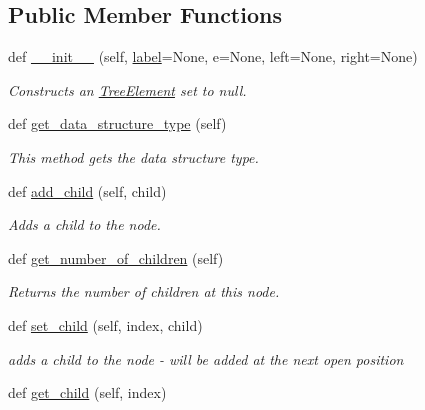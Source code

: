 \subsection*{Public Member Functions}
\begin{DoxyCompactItemize}
\item 
def \mbox{\hyperlink{class_bridges_1_1_tree_element_1_1_tree_element_a523764e27ed94055175b22574b730046}{\+\_\+\+\_\+init\+\_\+\+\_\+}} (self, \mbox{\hyperlink{class_bridges_1_1_element_1_1_element_a301fe5be8cf72b2c62f6a218feeb9166}{label}}=None, e=None, left=None, right=None)
\begin{DoxyCompactList}\small\item\em Constructs an \mbox{\hyperlink{class_bridges_1_1_tree_element_1_1_tree_element}{Tree\+Element}} set to null. \end{DoxyCompactList}\item 
def \mbox{\hyperlink{class_bridges_1_1_tree_element_1_1_tree_element_ae86084b9e0f55f0cd37ea451de956c48}{get\+\_\+data\+\_\+structure\+\_\+type}} (self)
\begin{DoxyCompactList}\small\item\em This method gets the data structure type. \end{DoxyCompactList}\item 
def \mbox{\hyperlink{class_bridges_1_1_tree_element_1_1_tree_element_a0d2549b396118f42d741ef1d53b721a4}{add\+\_\+child}} (self, child)
\begin{DoxyCompactList}\small\item\em Adds a child to the node. \end{DoxyCompactList}\item 
def \mbox{\hyperlink{class_bridges_1_1_tree_element_1_1_tree_element_a6a557bdf0d8e98009f3e4e960f01cf24}{get\+\_\+number\+\_\+of\+\_\+children}} (self)
\begin{DoxyCompactList}\small\item\em Returns the number of children at this node. \end{DoxyCompactList}\item 
def \mbox{\hyperlink{class_bridges_1_1_tree_element_1_1_tree_element_ac03788ed77411b40ba69fb7cce00b3f8}{set\+\_\+child}} (self, index, child)
\begin{DoxyCompactList}\small\item\em adds a child to the node -\/ will be added at the next open position \end{DoxyCompactList}\item 
def \mbox{\hyperlink{class_bridges_1_1_tree_element_1_1_tree_element_a79ac9326c525aaa5c5ed6a4aebdd1e19}{get\+\_\+child}} (self, index)

\end{DoxyCompactItemize}
